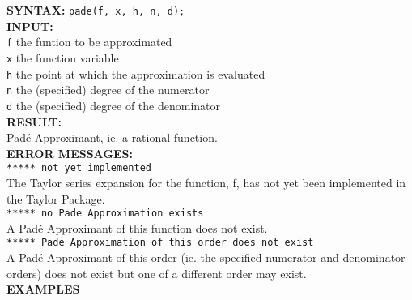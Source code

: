 \hypertarget{operator:PADE}{}
\textbf{SYNTAX:} \hspace{5mm} \texttt{pade(f, x, h, n, d);}\\[\baselineskip]

\textbf{INPUT:}\\[\baselineskip]
\texttt{f} \hspace{6mm} the funtion to be approximated\\
\texttt{x} \hspace{6mm} the function variable\\
\texttt{h} \hspace{6mm} the point at which the approximation is evaluated\\
\texttt{n} \hspace{6mm} the (specified) degree of the numerator\\
\texttt{d} \hspace{6mm} the (specified) degree of the denominator\\[\baselineskip]
\textbf{RESULT:} \\
Pad\'{e} Approximant, ie. a rational function.\\[\baselineskip]

\textbf{ERROR MESSAGES:}\\

 \hspace{6mm} \texttt{***** not yet implemented}\\

The Taylor series expansion for the function, f, has not yet
been implemented in the {\REDUCE} Taylor Package.\\[\baselineskip]

 \hspace{6mm} \texttt{***** no Pade Approximation exists}\\

A Pad\'{e} Approximant of this function does not exist.\\[\baselineskip]

 \hspace{6mm} \texttt{***** Pade Approximation of this order does not exist}\\

A Pad\'{e} Approximant of this order (ie. the specified
numerator and denominator orders) does not exist but one
of a different order may exist.\\[\baselineskip]

{\large\textbf{EXAMPLES}}

